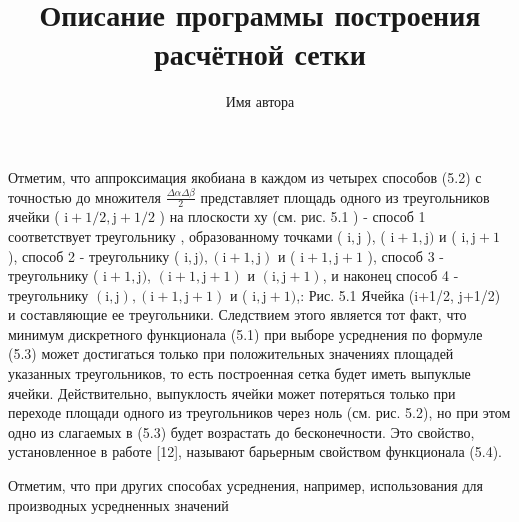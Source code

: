 \documentclass{article}
\title{Описание программы построения расчётной сетки}
\author{Имя автора}
\date{}
\begin{document}
Отметим, что аппроксимация якобиана в каждом из четырех способов (5.2) с точностью до множителя $\frac{\Delta \alpha \Delta \beta}{2}$ представляет площадь одного из треугольников ячейки ( $\mathrm{i}+1 / 2, \mathrm{j}+1 / 2$ ) на плоскости ху (см. рис. 5.1 ) - способ 1 соответствует треугольнику , образованному точками ( $\mathrm{i}, \mathrm{j}$ ), ( $\mathrm{i}+1, \mathrm{j})$ и ( $\mathrm{i}, \mathrm{j}+1$ ), способ 2 - треугольнику ( $\mathrm{i}, \mathrm{j}),(\mathrm{i}+1, \mathrm{j})$ и ( $\mathrm{i}+1, \mathrm{j}+1$ ), способ 3 - треугольнику ( $\mathrm{i}+1, \mathrm{j})$, $(\mathrm{i}+1, \mathrm{j}+1)$ и $(\mathrm{i}, \mathrm{j}+1)$, и наконец способ 4 - треугольнику $(\mathrm{i}, \mathrm{j}),(\mathrm{i}+1, \mathrm{j}+1)$ и ( $\mathrm{i}, \mathrm{j}+1)$,:
Рис. 5.1
Ячейка (i+1/2, j+1/2) и составляющие ее треугольники.
Следствием этого является тот факт, что минимум дискретного функционала (5.1) при выборе усреднения по формуле (5.3) может достигаться только при положительных значениях площадей указанных треугольников, то есть построенная сетка будет иметь выпуклые ячейки. Действительно, выпуклость ячейки может потеряться только при переходе площади одного из треугольников через ноль (см. рис. 5.2), но при этом одно из слагаемых в (5.3) будет возрастать до бесконечности. Это свойство, установленное в работе [12], называют барьерным свойством функционала (5.4).

Отметим, что при других способах усреднения, например, использования для производных усредненных значений
\end{document}

